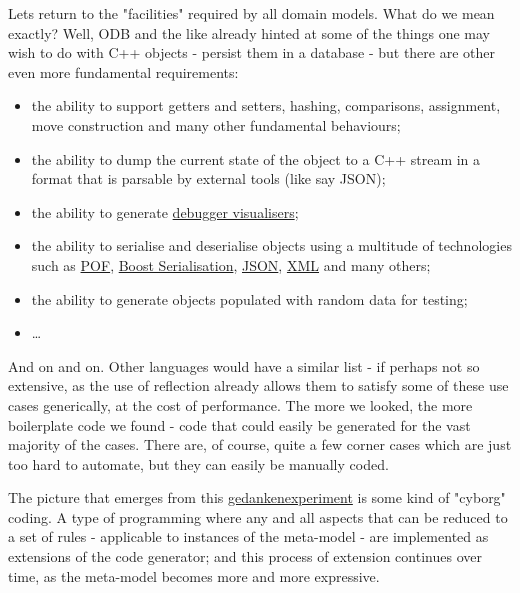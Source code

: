 \documentclass[11pt]{article}
\begin{document}
Lets return to the "facilities" required by all domain models. What do
we mean exactly? Well, ODB and the like already hinted at some of the
things one may wish to do with C++ objects - persist them in a
database - but there are other even more fundamental requirements:

\begin{itemize}
\item the ability to support getters and setters, hashing, comparisons,
assignment, move construction and many other fundamental behaviours;
\item the ability to dump the current state of the object to a C++ stream
in a format that is parsable by external tools (like say JSON);
\item the ability to generate \href{http://stackoverflow.com/questions/5140475/how-to-write-native-c-debugger-visualizers-in-gdb-totalview-for-complicated-t}{debugger visualisers};
\item the ability to serialise and deserialise objects using a multitude
of technologies such as \href{http://download.oracle.com/otn_hosted_doc/coherence/353CPP/index.html}{POF}, \href{http://www.boost.org/doc/libs/1_55_0/libs/serialization/doc/index.html}{Boost Serialisation}, \href{https://github.com/hjiang/jsonxx}{JSON}, \href{http://libxmlplusplus.sourceforge.net/}{XML} and many
others;
\item the ability to generate objects populated with random data for
testing;
\item \ldots{}
\end{itemize}

And on and on. Other languages would have a similar list - if perhaps
not so extensive, as the use of reflection already allows them to
satisfy some of these use cases generically, at the cost of
performance. The more we looked, the more boilerplate code we found -
code that could easily be generated for the vast majority of the
cases. There are, of course, quite a few corner cases which are just
too hard to automate, but they can easily be manually coded.

The picture that emerges from this \href{http://en.wikipedia.org/wiki/Thought_experiment}{gedankenexperiment} is some kind of
"cyborg" coding. A type of programming where any and all aspects that
can be reduced to a set of rules - applicable to instances of the
meta-model - are implemented as extensions of the code generator; and
this process of extension continues over time, as the meta-model
becomes more and more expressive.
\end{document}
